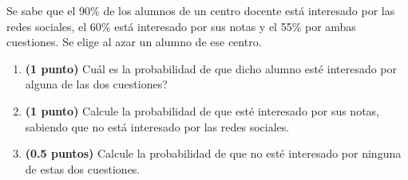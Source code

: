 
Se sabe que el 90\% de los alumnos de un centro docente está interesado por las redes sociales, el 60\% está interesado por sus notas y el 55\% por ambas cuestiones. Se elige al azar un alumno de ese centro.
\begin{enumerate}[label=\alph*)]
\item \textbf{(1 punto)} \textquestiondown{}Cuál es la probabilidad de que dicho alumno esté interesado por alguna de las dos cuestiones?
\item \textbf{(1 punto)} Calcule la probabilidad de que esté interesado por sus notas, sabiendo que no está interesado por las redes sociales.
\item \textbf{(0.5 puntos)} Calcule la probabilidad de que no esté interesado por ninguna de estas dos cuestiones.
\end{enumerate}
